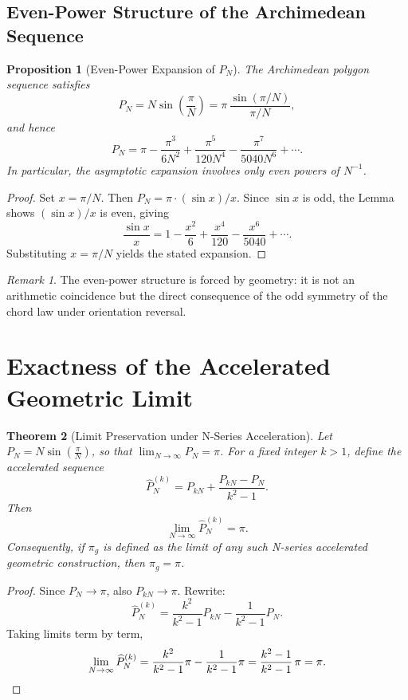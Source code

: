 \documentclass[12pt]{article}
\newtheorem{theorem}{Theorem}[section]
\newtheorem{proposition}[theorem]{Proposition}
\theoremstyle{remark}
\newtheorem{remark}{Remark}[section]
\begin{document}
\subsection{Even-Power Structure of the Archimedean Sequence}

\begin{proposition}[Even-Power Expansion of $P_N$]
The Archimedean polygon sequence satisfies
\[
  P_N = N\sin\!\left(\frac{\pi}{N}\right)
      = \pi\,\frac{\sin(\pi/N)}{\pi/N},
\]
and hence
\[
  P_N = \pi - \frac{\pi^3}{6N^2} + \frac{\pi^5}{120N^4}
      - \frac{\pi^7}{5040N^6} + \cdots.
\]
In particular, the asymptotic expansion involves only even powers of $N^{-1}$.
\end{proposition}

\begin{proof}
Set $x = \pi/N$. Then $P_N = \pi\cdot(\sin x)/x$.
Since $\sin x$ is odd, the Lemma shows $(\sin x)/x$ is even, giving
\[
  \frac{\sin x}{x} = 1 - \frac{x^2}{6} + \frac{x^4}{120}
                    - \frac{x^6}{5040} + \cdots.
\]
Substituting $x=\pi/N$ yields the stated expansion.
\end{proof}

\begin{remark}
The even-power structure is forced by geometry: it is not an arithmetic
coincidence but the direct consequence of the odd symmetry of the chord law
under orientation reversal.
\end{remark}

\section{Exactness of the Accelerated Geometric Limit}

\begin{theorem}[Limit Preservation under N-Series Acceleration]
\label{thm:two-scale}
Let $P_N = N\sin\!\left(\frac{\pi}{N}\right)$, so that $\lim_{N\to\infty}P_N = \pi$.
For a fixed integer $k > 1$, define the accelerated sequence
\[
  \widehat{P}_N^{(k)}
  = P_{kN} + \frac{P_{kN} - P_N}{k^2 - 1}.
\]
Then
\[
  \lim_{N \to \infty} \widehat{P}_N^{(k)} = \pi.
\]
Consequently, if $\pi_g$ is defined as the limit of any such N-series
accelerated geometric construction, then $\pi_g = \pi$.
\end{theorem}

\begin{proof}
Since $P_N \to \pi$, also $P_{kN} \to \pi$. Rewrite:
\[
  \widehat{P}_N^{(k)}
  = \frac{k^2}{k^2-1}P_{kN} - \frac{1}{k^2-1}P_N.
\]
Taking limits term by term,
\[
  \lim_{N\to\infty}\widehat{P}_N^{(k)}
  = \frac{k^2}{k^2-1}\pi - \frac{1}{k^2-1}\pi
  = \frac{k^2-1}{k^2-1}\,\pi = \pi. \qedhere
\]
\end{proof}
\end{document}
